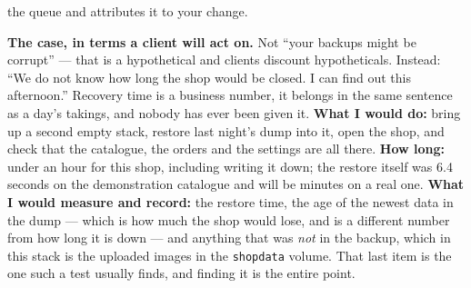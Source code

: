 \begin{ans}
        the queue and attributes it to your change.
  \item \textbf{The case, in terms a client will act on.} Not ``your backups
        might be corrupt'' --- that is a hypothetical and clients discount
        hypotheticals. Instead: ``We do not know how long the shop would be
        closed. I can find out this afternoon.'' Recovery time is a business
        number, it belongs in the same sentence as a day's takings, and nobody
        has ever been given it. \textbf{What I would do:} bring up a second
        empty stack, restore last night's dump into it, open the shop, and
        check that the catalogue, the orders and the settings are all there.
        \textbf{How long:} under an hour for this shop, including writing it
        down; the restore itself was 6.4 seconds on the demonstration
        catalogue and will be minutes on a real one. \textbf{What I would
        measure and record:} the restore time, the age of the newest data in
        the dump --- which is how much the shop would lose, and is a different
        number from how long it is down --- and anything that was \emph{not} in
        the backup, which in this stack is the uploaded images in the
        \texttt{shopdata} volume. That last item is the one such a test
        usually finds, and finding it is the entire point.
\end{ans}

